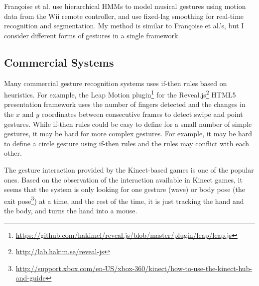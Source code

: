 Fran{\c{c}}oise et al. \cite{francoise11} use hierarchical HMMs to model musical
gestures using motion data from the Wii remote controller, and use fixed-lag
smoothing for real-time recognition and segmentation.
My method is similar to Fran{\c{c}}oise et al.'s, but I consider different
forms of gestures in a single framework.

\subsection{Commercial Systems}
Many commercial gesture recognition systems uses if-then rules based on
heuristics. For example, the Leap Motion
plugin\footnote{\url{https://github.com/hakimel/reveal.js/blob/master/plugin/leap/leap.js}}
for the Reveal.js\footnote{\url{http://lab.hakim.se/reveal-js}} HTML5
presentation framework uses the number of fingers detected and the changes in the $x$ and $y$ coordinates between consecutive
frames to detect swipe and point gestures. While if-then rules could be easy to define for
a small number of simple gestures, it may be hard for more complex gestures.
For example, it may be hard to define a circle gesture using if-then rules and
the rules may conflict with each other.

The gesture interaction provided by the Kinect-based games is
one of the popular ones. Based on the observation of the interaction
available in Kinect games, it seems that the system is only looking for one
gesture (wave) or body pose (the exit
pose\footnote{\url{http://support.xbox.com/en-US/xbox-360/kinect/how-to-use-the-kinect-hub-and-guide}}) at a time, and the rest of the time, 
it is just tracking the hand and the body, and turns the hand into a mouse.

% 

